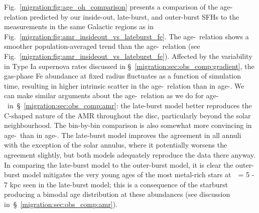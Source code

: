 \documentclass[main.tex]{subfiles}
\begin{document}
Fig.~\ref{migration:fig:age_oh_comparison} presents a comparison of the age-\oh~ 
relation predicted by our inside-out, late-burst, and outer-burst SFHs to 
the~\citet{Feuillet2019} measurements in the same Galactic regions as in 
Fig.~\ref{migration:fig:amr_insideout_vs_lateburst_fe}. 
The age-\oh~relation shows a smoother population-averaged trend than the 
age-\feh~relation (see Fig.~\ref{migration:fig:amr_insideout_vs_lateburst_fe}). 
Affected by the variability in Type Ia supernova rates discussed in 
\S~\ref{migration:sec:obs_comp:gradient}, the gas-phase Fe abundance at fixed radius 
fluctuates as a function of simulation time, resulting in higher intrinsic 
scatter in the age-\feh~relation than in age-\oh. 
We can make similar arguments about the age-\oh~relation as we do for 
age-\feh~in~\S~\ref{migration:sec:obs_comp:amr}: the late-burst model better reproduces 
the C-shaped nature of the AMR throughout the disc, particularly beyond the 
solar neighbourhood. 
The bin-by-bin comparison is also somewhat more convincing in age-\oh~than in 
age-\feh. 
The late-burst model improves the agreement in all annuli with the exception of 
the solar annulus, where it potentially worsens the agreement slightly, but 
both models adequately reproduce the data there anyway. 
In comparing the late-burst model to the outer-burst model, it is clear the 
outer-burst model mitigates the very young ages of the most metal-rich stars 
at~\rgal~= 5 - 7 kpc seen in the late-burst model; this is a consequence of 
the starburst producing a bimodal age distribution at these abundances (see 
discussion in~\S~\ref{migration:sec:obs_comp:amr}). 
\end{document}
